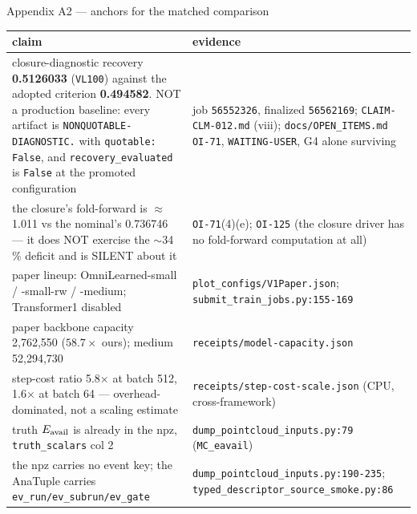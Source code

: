 \documentclass[aspectratio=169,10pt]{beamer}
\newcommand{\warn}[1]{\textcolor{warn}{#1}}
\begin{document}
\begin{frame}{Appendix A2 --- anchors for the matched comparison}
  \begin{center}\scriptsize
  \begin{tabular}{@{}R{0.42\textwidth}R{0.53\textwidth}@{}}
    \toprule
    \textbf{claim} & \textbf{evidence} \\
    \midrule
    \warn{closure-diagnostic} recovery \textbf{0.5126033} (\texttt{VL100}) against the
      adopted criterion \textbf{0.494582}. \warn{NOT a production baseline: every
      artifact is \texttt{NONQUOTABLE-DIAGNOSTIC.} with \texttt{quotable: False}, and
      \texttt{recovery\_evaluated} is \texttt{False} at the promoted configuration} &
      job \texttt{56552326}, finalized \texttt{56562169}; \texttt{CLAIM-CLM-012.md}
      (viii); \warn{\texttt{docs/OPEN\_ITEMS.md} \texttt{OI-71}, \texttt{WAITING-USER},
      G4 alone surviving} \\
    \warn{the closure's fold-forward is $\approx$1.011 vs the nominal's 0.736746 --- it
      does NOT exercise the $\sim$34\,\% deficit and is SILENT about it} &
      \texttt{OI-71}(4)(e); \texttt{OI-125} (the closure driver has no fold-forward
      computation at all) \\
    paper lineup: OmniLearned-small / -small-rw / -medium; Transformer1 disabled &
      \texttt{plot\_configs/V1Paper.json}; \texttt{submit\_train\_jobs.py:155-169} \\
    paper backbone capacity 2{,}762{,}550 ($58.7\times$ ours); medium 52{,}294{,}730 &
      \texttt{receipts/model-capacity.json} \\
    step-cost ratio 5.8$\times$ at batch 512, 1.6$\times$ at batch 64 ---
      \warn{overhead-dominated, not a scaling estimate} &
      \texttt{receipts/step-cost-scale.json} (CPU, cross-framework) \\
    truth $E_{\rm avail}$ is already in the npz, \texttt{truth\_scalars} col 2 &
      \texttt{dump\_pointcloud\_inputs.py:79} (\texttt{MC\_eavail}) \\
    the npz carries \warn{no event key}; the AnaTuple carries
      \texttt{ev\_run/ev\_subrun/ev\_gate} &
      \texttt{dump\_pointcloud\_inputs.py:190-235};
      \texttt{typed\_descriptor\_source\_smoke.py:86} \\
    \bottomrule
  \end{tabular}
  \end{center}
\end{frame}
\end{document}
